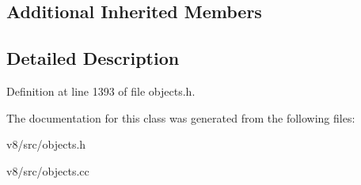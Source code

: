 \subsection*{Additional Inherited Members}


\subsection{Detailed Description}


Definition at line 1393 of file objects.\+h.



The documentation for this class was generated from the following files\+:\begin{DoxyCompactItemize}
\item 
v8/src/objects.\+h\item 
v8/src/objects.\+cc\end{DoxyCompactItemize}
